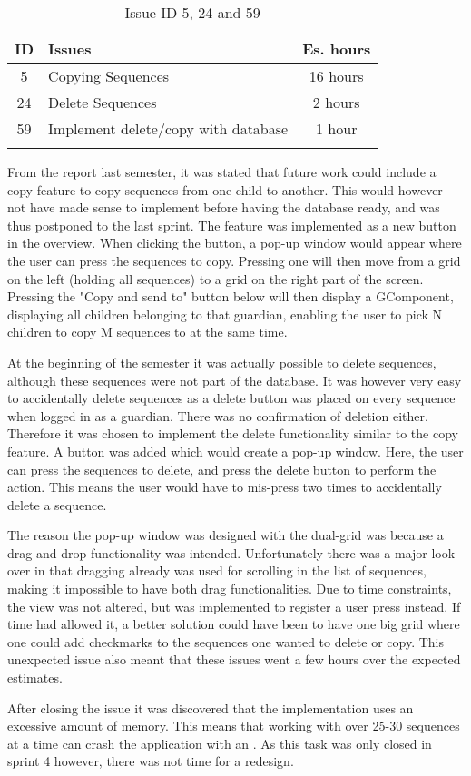 \begin{longtable} { | c | p{12cm} | c | } 
\hline
	ID 	&	Issues	&		 Es. hours \\\hline
	5	&	Copying Sequences	&	16 hours	\\\hline
	24	& 	Delete Sequences	&	2 hours \\\hline
	59  	&	Implement delete/copy with database	&	1 hour \\\hline
\caption{Issue ID 5, 24 and 59}
\label{tab:spr4_copyingsequences}
\end{longtable}

From the report last semester, it was stated that future work could include a copy feature to copy sequences from one child to another. This would however not have made sense to implement before having the database ready, and was thus postponed to the last sprint. The feature was implemented as a new button in the overview. When clicking the button, a pop-up window would appear where the user can press the sequences to copy. Pressing one will then move from a grid on the left (holding all sequences) to a grid on the right part of the screen. Pressing the "Copy and send to" button below will then display a GComponent, displaying all children belonging to that guardian, enabling the user to pick N children to copy M sequences to at the same time. 

At the beginning of the semester it was actually possible to delete sequences, although these sequences were not part of the database. It was however very easy to accidentally delete sequences as a delete button was placed on every sequence when logged in as a guardian. There was no confirmation of deletion either.  Therefore it was chosen to implement the delete functionality similar to the copy feature. A button was added which would create a pop-up window. Here, the user can press the sequences to delete, and press the delete button to perform the action. This means the user would have to mis-press two times to accidentally delete a sequence.

The reason the pop-up window was designed with the dual-grid was because a drag-and-drop functionality was intended. Unfortunately there was a major look-over in that dragging already was used for scrolling in the list of sequences, making it impossible to have both drag functionalities. Due to time constraints, the view was not altered, but was implemented to register a user press instead. If time had allowed it, a better solution could have been to have one big grid where one could add checkmarks to the sequences one wanted to delete or copy. This unexpected issue also meant that these issues went a few hours over the expected estimates.

After closing the issue it was discovered that the implementation uses an excessive amount of memory. This means that working with over 25-30 sequences at a time can crash the application with an . As this task was only closed in sprint 4 however, there was not time for a redesign.